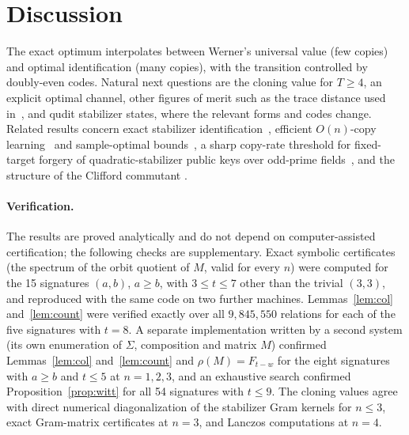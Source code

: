 \documentclass[11pt]{article}
\theoremstyle{definition}
\theoremstyle{remark}
\begin{document}
\section{Discussion}
The exact optimum interpolates between Werner's universal value (few copies) and optimal identification (many copies),
with the transition controlled by doubly-even codes. Natural next questions are the cloning value for $T\ge4$, an
explicit optimal channel, other figures of merit such as the trace distance used in~\cite{Herasymenko2026}, and qudit
stabilizer states, where the relevant forms and codes change. Related results concern exact stabilizer
identification~\cite{HayashiLu2026}, efficient $O(n)$-copy learning~\cite{Montanaro2017} and sample-optimal
bounds~\cite{Chang2026}, a sharp copy-rate threshold for fixed-target forgery of quadratic-stabilizer public keys over
odd-prime fields~\cite{HayashiZhaoYu2026}, and the structure of the Clifford commutant
\cite{GNW2021,MMGross2021,Bittel2026,ZKGG2016}.

\paragraph{Verification.} The results are proved analytically and do not depend on computer-assisted
certification; the following checks are supplementary. Exact symbolic certificates (the spectrum of the orbit quotient of $M$, valid for every
$n$) were computed for the 15 signatures $(a,b)$, $a\ge b$, with $3\le t\le7$ other than the trivial $(3,3)$, and
reproduced with the same code on two further machines. Lemmas~\ref{lem:col} and~\ref{lem:count} were verified exactly
over all $9{,}845{,}550$ relations for each of the five signatures with $t=8$. A separate implementation written by a
second system (its own enumeration of $\Sigma$, composition and matrix $M$) confirmed Lemmas~\ref{lem:col}
and~\ref{lem:count} and $\rho(M)=F_{t-w}$ for the eight signatures with $a\ge b$ and $t\le5$ at $n=1,2,3$, and an
exhaustive search confirmed Proposition~\ref{prop:witt} for all 54 signatures with $t\le9$. The cloning values agree
with direct numerical diagonalization of the stabilizer Gram kernels for $n\le3$, exact Gram-matrix certificates at
$n=3$, and Lanczos computations at $n=4$.
\end{document}
